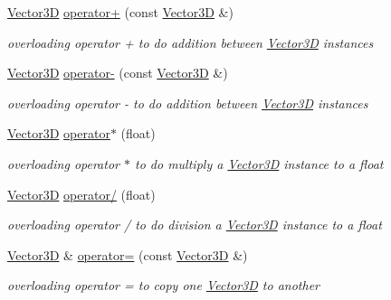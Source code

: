 \begin{DoxyCompactItemize}
\hyperlink{classcsci3081_1_1Vector3D}{Vector3D} \hyperlink{classcsci3081_1_1Vector3D_ab3ee9264eb4daa31ac3e9969de69f6ed}{operator+} (const \hyperlink{classcsci3081_1_1Vector3D}{Vector3D} \&)
\begin{DoxyCompactList}\small\item\em overloading operator + to do addition between \hyperlink{classcsci3081_1_1Vector3D}{Vector3D} instances \end{DoxyCompactList}\item 
\hyperlink{classcsci3081_1_1Vector3D}{Vector3D} \hyperlink{classcsci3081_1_1Vector3D_a9669e80c4ec8cfc7eb2131674d4eaa5f}{operator-\/} (const \hyperlink{classcsci3081_1_1Vector3D}{Vector3D} \&)
\begin{DoxyCompactList}\small\item\em overloading operator -\/ to do addition between \hyperlink{classcsci3081_1_1Vector3D}{Vector3D} instances \end{DoxyCompactList}\item 
\hyperlink{classcsci3081_1_1Vector3D}{Vector3D} \hyperlink{classcsci3081_1_1Vector3D_a3d57c334d87583b636cbd2c02081402a}{operator$\ast$} (float)
\begin{DoxyCompactList}\small\item\em overloading operator $\ast$ to do multiply a \hyperlink{classcsci3081_1_1Vector3D}{Vector3D} instance to a float \end{DoxyCompactList}\item 
\hyperlink{classcsci3081_1_1Vector3D}{Vector3D} \hyperlink{classcsci3081_1_1Vector3D_af0f6b2e769921a7a1bdf986f6f3ff277}{operator/} (float)
\begin{DoxyCompactList}\small\item\em overloading operator / to do division a \hyperlink{classcsci3081_1_1Vector3D}{Vector3D} instance to a float \end{DoxyCompactList}\item 
\hyperlink{classcsci3081_1_1Vector3D}{Vector3D} \& \hyperlink{classcsci3081_1_1Vector3D_a57dce219abef3de5e66fc5388731d640}{operator=} (const \hyperlink{classcsci3081_1_1Vector3D}{Vector3D} \&)
\begin{DoxyCompactList}\small\item\em overloading operator = to copy one \hyperlink{classcsci3081_1_1Vector3D}{Vector3D} to another \end{DoxyCompactList}\item 
\mbox{\label{classcsci3081_1_1Vector3D_ad57f6121d4aeb7912d93a2858ca43ae0}} 

\end{DoxyCompactItemize}
